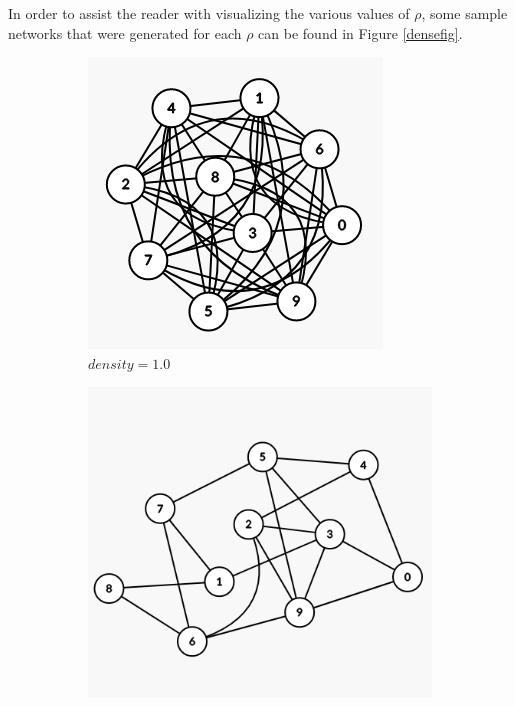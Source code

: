 \documentclass[letterpaper, 10 pt, conference]{ieeeconf}  %
\begin{document}
In order to assist the reader with visualizing the various values of $\rho$, some sample networks that were generated for each $\rho$ can be found in Figure \ref{densefig}.

\begin{figure}[H]
	\centering
	\begin{subfigure}[b]{0.15\textwidth}
		\centering
		\includegraphics[width=\textwidth]{sparsegraph100}
		\caption{$density=1.0$}
	\end{subfigure}
	\begin{subfigure}[b]{0.15\textwidth}
		\centering
		\includegraphics[width=\textwidth]{sparsegraph25}

\end{subfigure}
\end{figure}
\end{document}
